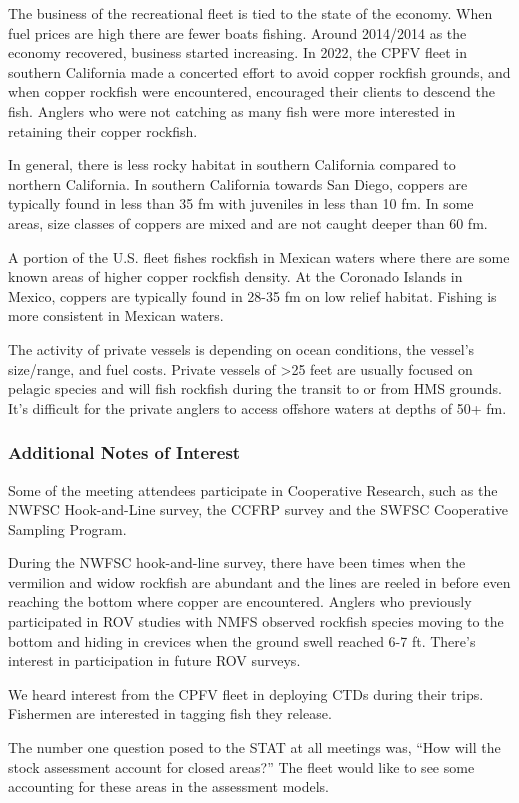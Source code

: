 \documentclass[11pt,
  english,
  letterpaper,
]{article}
\begin{document}
The business of the recreational fleet is tied to the state of the economy. When fuel prices are high there are fewer boats fishing. Around 2014/2014 as the economy recovered, business started increasing. In 2022, the CPFV fleet in southern California made a concerted effort to avoid copper rockfish grounds, and when copper rockfish were encountered, encouraged their clients to descend the fish. Anglers who were not catching as many fish were more interested in retaining their copper rockfish.

In general, there is less rocky habitat in southern California compared to northern California. In southern California towards San Diego, coppers are typically found in less than 35 fm with juveniles in less than 10 fm. In some areas, size classes of coppers are mixed and are not caught deeper than 60 fm.

A portion of the U.S. fleet fishes rockfish in Mexican waters where there are some known areas of higher copper rockfish density. At the Coronado Islands in Mexico, coppers are typically found in 28-35 fm on low relief habitat. Fishing is more consistent in Mexican waters.

The activity of private vessels is depending on ocean conditions, the vessel's size/range, and fuel costs. Private vessels of \textgreater25 feet are usually focused on pelagic species and will fish rockfish during the transit to or from HMS grounds. It's difficult for the private anglers to access offshore waters at depths of 50+ fm.

\hypertarget{additional-notes-of-interest}{%
\subsubsection{Additional Notes of Interest}\label{additional-notes-of-interest}}

Some of the meeting attendees participate in Cooperative Research, such as the NWFSC Hook-and-Line survey, the CCFRP survey and the SWFSC Cooperative Sampling Program.

During the NWFSC hook-and-line survey, there have been times when the vermilion and widow rockfish are abundant and the lines are reeled in before even reaching the bottom where copper are encountered. Anglers who previously participated in ROV studies with NMFS observed rockfish species moving to the bottom and hiding in crevices when the ground swell reached 6-7 ft. There's interest in participation in future ROV surveys.

We heard interest from the CPFV fleet in deploying CTDs during their trips. Fishermen are interested in tagging fish they release.

The number one question posed to the STAT at all meetings was, ``How will the stock assessment account for closed areas?'' The fleet would like to see some accounting for these areas in the assessment models.
\end{document}
